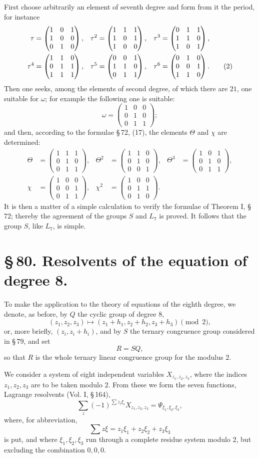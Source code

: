 \documentclass[11pt]{article}
\providecommand{\mmat}[9]{\begin{pmatrix}#1&#2&#3\\#4&#5&#6\\#7&#8&#9\end{pmatrix}}
\providecommand{\mmat}[9]{\begin{pmatrix}#1&#2&#3\\#4&#5&#6\\#7&#8&#9\end{pmatrix}}
\begin{document}
First choose arbitrarily an element of seventh degree and form from it the period, for instance
\begin{align}
 \tau&=\mmat{1}{0}{1}{1}{0}{0}{0}{1}{0},&
 \tau^2&=\mmat{1}{1}{1}{1}{0}{1}{1}{0}{0},&
 \tau^3&=\mmat{0}{1}{1}{1}{1}{0}{1}{0}{1},\notag\\
 \tau^4&=\mmat{1}{1}{0}{0}{1}{1}{1}{1}{1},&
 \tau^5&=\mmat{0}{0}{1}{1}{1}{0}{0}{1}{1},&
 \tau^6&=\mmat{0}{1}{0}{0}{0}{1}{1}{1}{0}.
 \tag{2}
\end{align}
Then one seeks, among the elements of second degree, of which there are $21$, one suitable for $\omega$; for example the following one is suitable:
\begin{equation}
 \omega=\mmat{1}{0}{0}{0}{1}{0}{0}{1}{1};
 \tag{3}
\end{equation}
and then, according to the formulae \S\,72, (17), the elements $\Theta$ and $\chi$ are determined:
\begin{align}
 \Theta&=\mmat{1}{1}{1}{0}{1}{0}{0}{1}{1},&
 \Theta^2&=\mmat{1}{1}{0}{0}{1}{0}{0}{0}{1},&
 \Theta^3&=\mmat{1}{0}{1}{0}{1}{0}{0}{1}{1},
 \tag{4}\\
 \chi&=\mmat{1}{0}{0}{0}{0}{1}{0}{1}{1},&
 \chi^2&=\mmat{1}{0}{0}{0}{1}{1}{0}{1}{0}.
 \tag{5}
\end{align}
It is then a matter of a simple calculation to verify the formulae of Theorem I, \S\,72; thereby the agreement of the groups $S$ and $L_7$ is proved. It follows that the group $S$, like $L_7$, is simple.

\section*{\S\,80. Resolvents of the equation of degree 8.}

To make the application to the theory of equations of the eighth degree, we denote, as before, by $Q$ the cyclic group of degree $8$,
\[
 (z_1,z_2,z_3)\longmapsto (z_1+h_1,z_2+h_2,z_3+h_3)\pmod 2,
\]
or, more briefly, $(z_i,z_i+h_i)$, and by $S$ the ternary congruence group considered in \S\,79, and set
\[
 R=SQ,
\]
so that $R$ is the whole ternary linear congruence group for the modulus $2$.

We consider a system of eight independent variables $X_{z_1,z_2,z_3}$, where the indices $z_1,z_2,z_3$ are to be taken modulo $2$. From these we form the seven functions, Lagrange resolvents (Vol. I, \S\,164),
\begin{equation}
 \sum_z (-1)^{\sum z_i\xi_i}X_{z_1,z_2,z_3}=\Psi_{\xi_1,\xi_2,\xi_3},
 \tag{1}
\end{equation}
where, for abbreviation,
\[
 \sum z\xi=z_1\xi_1+z_2\xi_2+z_3\xi_3
\]
is put, and where $\xi_1,\xi_2,\xi_3$ run through a complete residue system modulo $2$, but excluding the combination $0,0,0$.
\end{document}
